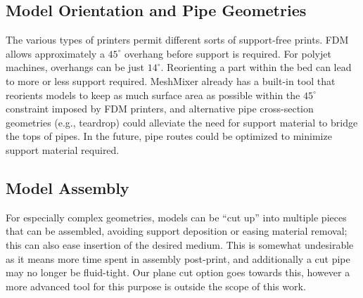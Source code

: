\subsection{Model Orientation and Pipe Geometries}
The various types of printers permit different sorts of support-free prints.  FDM allows approximately a $45^\circ$ overhang before support is required.  For polyjet machines, overhangs can be just $14^\circ$.  Reorienting a part within the bed can lead to more or less support required.  MeshMixer already has a built-in tool that reorients models to keep as much surface area as possible within the $45^\circ$ constraint imposed by FDM printers, and alternative pipe cross-section geometries (e.g., teardrop) could alleviate the need for support material to bridge the tops of pipes.  In the future, pipe routes could be optimized to minimize support material required.

\subsection{Model Assembly}
For especially complex geometries, models can be ``cut up'' into multiple pieces that can be assembled, avoiding support deposition or easing material removal; this can also ease insertion of the desired medium. This is somewhat undesirable as it means more time spent in assembly post-print, and additionally a cut pipe may no longer be fluid-tight.  Our plane cut option goes towards this, however a more advanced tool for this purpose is outside the scope of this work.